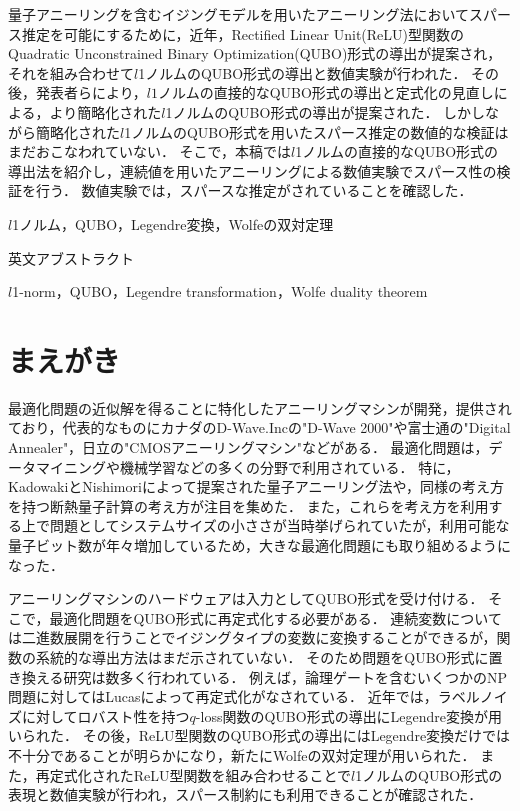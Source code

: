 \documentclass[technicalreport]{ieicej}
\begin{document}
\begin{jabstract}
  量子アニーリングを含むイジングモデルを用いたアニーリング法においてスパース推定を可能にするために，近年，Rectified Linear Unit(ReLU)型関数のQuadratic Unconstrained Binary Optimization(QUBO)形式の導出が提案され，それを組み合わせて$l$1ノルムのQUBO形式の導出と数値実験が行われた．
  その後，発表者らにより，$l1$ノルムの直接的なQUBO形式の導出と定式化の見直しによる，より簡略化された$l$1ノルムのQUBO形式の導出が提案された．
  しかしながら簡略化された$l$1ノルムのQUBO形式を用いたスパース推定の数値的な検証はまだおこなわれていない．
  そこで，本稿では$l$1ノルムの直接的なQUBO形式の導出法を紹介し，連続値を用いたアニーリングによる数値実験でスパース性の検証を行う．
  数値実験では，スパースな推定がされていることを確認した．
\end{jabstract}
\begin{jkeyword}
$l$1ノルム，QUBO，Legendre変換，Wolfeの双対定理
\end{jkeyword}
\begin{eabstract}
英文アブストラクト
\end{eabstract}
\begin{ekeyword}
$l$1-norm，QUBO，Legendre transformation，Wolfe duality theorem
\end{ekeyword}
\maketitle

\section{まえがき}
最適化問題の近似解を得ることに特化したアニーリングマシンが開発，提供されており，代表的なものにカナダのD-Wave.Inc\cite{d-wave01}\cite{d-wave02}の"D-Wave 2000"や富士通\cite{Digital_annealer}の"Digital Annealer"，日立の"CMOSアニーリングマシン"などがある．
最適化問題は，データマイニングや機械学習などの多くの分野で利用されている．
特に，KadowakiとNishimoriによって提案された量子アニーリング法\cite{Quantum_annealing}や，同様の考え方を持つ断熱量子計算\cite{AQC}の考え方が注目を集めた．
また，これらを考え方を利用する上で問題としてシステムサイズの小ささが当時挙げられていたが，利用可能な量子ビット数が年々増加しているため，大きな最適化問題にも取り組めるようになった．

アニーリングマシンのハードウェアは入力としてQUBO形式を受け付ける．
そこで，最適化問題をQUBO形式に再定式化する必要がある．
連続変数については二進数展開を行うことでイジングタイプの変数に変換することができるが，関数の系統的な導出方法はまだ示されていない．
そのため問題をQUBO形式に置き換える研究は数多く行われている．
例えば，論理ゲートを含むいくつかのNP問題に対してはLucasによって再定式化がなされている\cite{logic_gate}\cite{formulation}．
近年では，ラベルノイズに対してロバスト性を持つ$q$-loss関数のQUBO形式の導出にLegendre変換が用いられた\cite{q-loss_formulation}．
その後，ReLU型関数のQUBO形式の導出\cite{ReLU_function}にはLegendre変換だけでは不十分であることが明らかになり，新たにWolfeの双対定理\cite{Wolfe_duality}が用いられた．
また，再定式化されたReLU型関数を組み合わせることで$l$1ノルムのQUBO形式の表現と数値実験が行われ，スパース制約にも利用できることが確認された\cite{ReLU_simmulate}．
\end{document}

